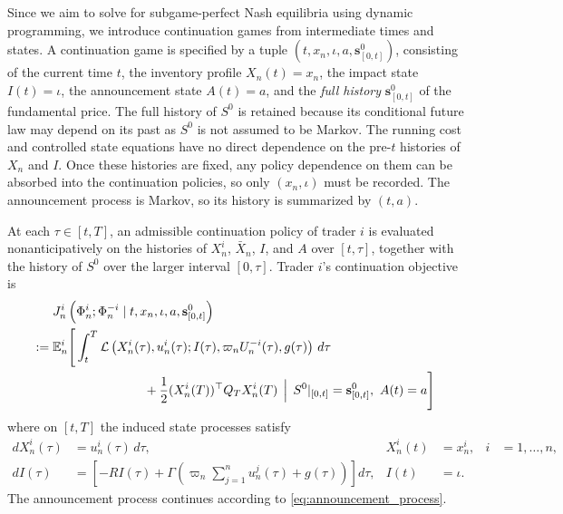 \documentclass[12pt]{article}
\numberwithin{equation}{section}
\theoremstyle{definition}
\begin{document}
Since we aim to solve for subgame-perfect Nash equilibria using dynamic
programming, we introduce continuation games from intermediate times and
states. A continuation game is specified by a tuple
\((t,x_n,\iota,a,\mathbf{s}^0_{[0,t]})\), consisting of the current time \(t\), the
inventory profile \(X_n(t)=x_n\), the impact state \(I(t)=\iota\), the
announcement state \(A(t)=a\), and the \emph{full history} \(\mathbf{s}^0_{[0,t]}\) of
the fundamental price. The full history of \(S^0\) is retained because its
conditional future law may depend on its past as \(S^0\) is not assumed to be Markov. The running cost and controlled
state equations have no direct dependence on the pre-\(t\) histories of
\(X_n\) and \(I\). Once these histories are fixed, any policy dependence on
them can be absorbed into the continuation policies, so only
\((x_n,\iota)\) must be recorded. The announcement process is
Markov, so its history is summarized by \((t,a)\).

At each \(\tau\in[t,T]\), an admissible continuation policy of trader \(i\)
is evaluated nonanticipatively on the histories of \(X_n^i\), \(\bar X_n\),
\(I\), and \(A\) over \([t,\tau]\), together with the history of \(S^0\) over
the larger interval \([0,\tau]\). Trader \(i\)'s continuation objective is
\begin{equation}\label{eq:reduced_continuation_objective}
\begin{aligned}
&J_n^i\left(
\Phi_n^i;\Phi_n^{-i}
\mid t,x_n,\iota,a,\mathbf{s}^0_{[0,t]}
\right)
\\
:={}&\mathbb E_n^i\Bigg[
\int_t^T
\mathcal L\left(
X_n^i(\tau),u_n^i(\tau);
I(\tau),\varpi_nU_n^{-i}(\tau),g(\tau)
\right)\,d\tau
\\
&\hspace{72pt}
+\frac{1}{2}(X_n^i(T))^\top Q_TX_n^i(T)
\,\Bigm|\,
S^0|_{[0,t]}=\mathbf{s}^0_{[0,t]},\ A(t)=a
\Bigg]
\end{aligned}
\end{equation}
where on \([t,T]\) the induced state processes satisfy
\begin{equation}\label{eq:continuation_state_dynamics}
\begin{aligned}
dX_n^i(\tau)
&=u_n^i(\tau)\,d\tau,
&X_n^i(t)&=x_n^i,
&i&=1,\ldots,n,\\
dI(\tau)
&=\left[-RI(\tau)
+\Gamma\left(
\varpi_n\sum_{j=1}^n u_n^j(\tau)+g(\tau)
\right)\right]d\tau,
&I(t)&=\iota.
\end{aligned}
\end{equation}
The announcement process continues according to
\eqref{eq:announcement_process}.
\end{document}

